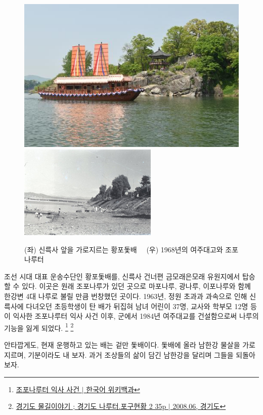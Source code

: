 \begin{figure}[ht]
    \centering
    \includegraphics[width=.45\textwidth]{img/황포돛배.jpg}
    \includegraphics[width=.45\textwidth]{img/조포나루.jpg}
    \caption{(좌) 신륵사 앞을 가로지르는 황포돛배\protect\footnotemark $\quad$ (우) 1968년의 여주대고와 조포나루터\protect\footnotemark }
    \label{fig:my_labe6}
\end{figure}


조선 시대 대표 운송수단인 황포돛배를, 신륵사 건너편 금모래은모래 유원지에서 탑승할 수 있다. 
이곳은 원래 조포나루가 있던 곳으로 마포나루, 광나루, 이포나루와 함께 한강변 4대 나루로 불릴 만큼 번창했던 곳이다.
1963년, 정원 초과과 과속으로 인해
신륵사에 다녀오던 초등학생이 탄 배가 뒤집혀 남녀 어린이 37명, 교사와 학부모 12명 등이 익사한 조포나루터 익사 사건 이후,
군에서 1984년 여주대교를 건설함으로써 나루의 기능을 잃게 되었다.
\footnote{\href{https://ko.wikipedia.org/wiki/조포나루터_익사_사건}{조포나루터 익사 사건 $|$ 한국어 위키백과}}
\footnote{\href{https://memory.library.kr/files/original/fdb94afbd1306c25cc6bd7f1c80e6f0f.pdf}{경기도 물길이야기 ; 경기도 나루터.포구현황 2 35p $|$ 2008.06, 경기도}}

안타깝게도, 현재 운행하고 있는 배는 겉만 돛배이다.
돛배에 올라 남한강 물살을 가로지르며, 기분이라도 내 보자.
과거 조상들의 삶이 담긴 남한강을 달리며 그들을 되돌아보자.

